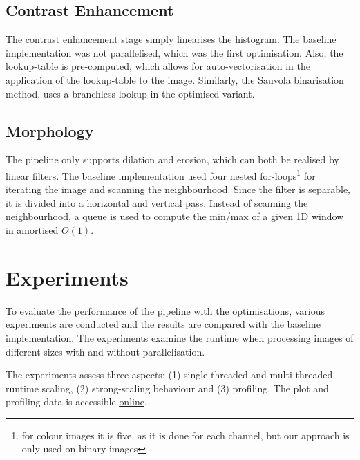 \documentclass[sigconf]{acmart}
\begin{document}

\subsection{Contrast Enhancement}

The contrast enhancement stage simply linearises the histogram. The baseline implementation was not parallelised, which was the first optimisation. Also, the lookup-table is pre-computed, which allows for auto-vectorisation in the application of the lookup-table to the image. Similarly, the Sauvola binarisation method, uses a branchless lookup in the optimised variant.

\subsection{Morphology}
The pipeline only supports dilation and erosion, which can both be realised by linear filters. The baseline implementation used four nested for-loops\footnote{for colour images it is five, as it is done for each channel, but our approach is only used on binary images} for iterating the image and scanning the neighbourhood. Since the filter is separable, it is divided into a horizontal and vertical pass. Instead of scanning the neighbourhood, a queue is used to compute the min/max of a given 1D window in amortised $O(1)$.


\section{Experiments}
\label{sec:experiments}

To evaluate the performance of the pipeline with the optimisations, various experiments are conducted and the results are compared with the baseline implementation. The experiments examine the runtime when processing images of different sizes with and without parallelisation.

The experiments assess three aspects: (1) single-threaded and multi-threaded runtime scaling, (2) strong-scaling behaviour and (3) profiling. The plot and profiling data is accessible \underline{\href{https://github.com/MherMnatsakanyan03/image_text_enhancer/tree/paper/paper/graphics}{online}}.
\end{document}

